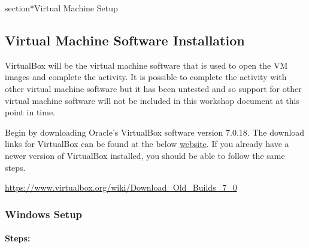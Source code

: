 \documentclass[letterpaper,12pt]{report}
\begin{document}
\clearpage
{}
\settableofcontents
\tableofcontents
\clearpage

\newpage

section*{Virtual Machine Setup}\label{sec:Virtual-Machine-Setup}

\subsection*{Virtual Machine Software Installation}\label{sec:Virtual-Machine-Software-Installation}

VirtualBox will be the virtual machine software that is used to open the VM images and complete the activity. It is possible to complete the activity with other virtual machine software but it has been untested and so support for other virtual machine software will not be included in this workshop document at this point in time.

Begin by downloading Oracle's VirtualBox software version 7.0.18. The download links for VirtualBox can be found at the below \href{https://www.virtualbox.org/wiki/Download_Old_Builds_7_0}{website}. If you already have a newer version of VirtualBox installed, you should be able to follow the same steps.

\url{https://www.virtualbox.org/wiki/Download_Old_Builds_7_0}

\subsubsection*{Windows Setup}\label{sec:Virtual-Machine-Windows-Setup}

\paragraph*{Steps:}
\end{document}
